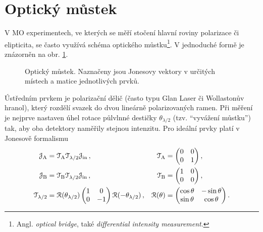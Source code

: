 \section{Optický můstek}
\label{chap:mustek-kap2}
V MO experimentech, ve kterých se měří stočení hlavní roviny polarizace či elipticita, se často využívá schéma optického můstku\footnote{Angl. \emph{optical bridge}, také \emph{differential intensity measurement}.}\cite{silberQuadraticMagnetoopticKerr2019a}.
V jednoduché formě je znázorněn na obr. \ref{fig:mustek-schema}.

\begin{figure}[htbp]
    \centering
    
    \caption{Optický můstek. Naznačeny jsou Jonesovy vektory v určitých místech a matice jednotlivých prvků.}
    \label{fig:mustek-schema}
\end{figure}

Ústředním prvkem je polarizační dělič (často typu Glan Laser či Wollastonův hranol), který rozdělí svazek do dvou lineárně polarizovaných ramen.
Při měření je nejprve nastaven úhel rotace půlvlnné destičky $\theta_{\lambda/2}$ (tzv. ``vyvážení můstku'') tak, aby oba detektory naměřily stejnou intenzitu.
Pro ideální prvky platí v Jonesově formalismu
\begin{subequations}
\label{eqn:ideal-mustek}
\begin{align}
    \mathcal{J}_\textrm{A} &= \mathcal{T}_\textrm{A} \mathcal{T}_{\lambda/2} \mathcal{J}_\textrm{in} \,, & 
    \mathcal{T}_\textrm{A} &=\begin{pmatrix} 0&0\\0&1 \end{pmatrix} , \\
    \mathcal{J}_\textrm{B} &= \mathcal{T}_\textrm{B} \mathcal{T}_{\lambda/2} \mathcal{J}_\textrm{in} \,, &
    \mathcal{T}_\textrm{B} & =\begin{pmatrix} 1&0\\0&0 \end{pmatrix} ,\\
    \mathcal{T}_{\lambda/2} &=\mathcal{R}(\theta_{\lambda/2})\begin{pmatrix} 1&0\\0&-1 \end{pmatrix}\mathcal{R}(-\theta_{\lambda/2}) \,, & 
    \mathcal{R}(\theta) &=\begin{pmatrix} \cos\theta&-\sin\theta\\\sin\theta&\cos\theta \end{pmatrix} .
\end{align}
\end{subequations}

